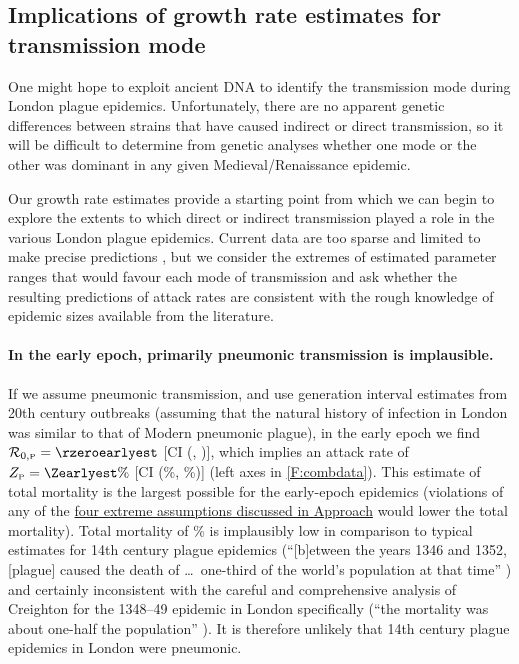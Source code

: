 \hypertarget{implications}{}
\subsection*{Implications of growth rate estimates for transmission mode}
\label{sec:implications}

One might hope to exploit ancient DNA \cite{Bos+11,Wagn+14} to identify the transmission mode during London plague epidemics.  Unfortunately, there are no apparent genetic differences between strains that have caused indirect or direct transmission, so it will be difficult to determine from genetic analyses whether one mode or the other was dominant in any given Medieval/Renaissance epidemic.

Our growth rate estimates provide a starting point from which we can begin to explore the extents to which direct or indirect transmission played a role in the various London plague epidemics.  Current data are too sparse and limited to make precise predictions \cite{Ma+14,Park+18}, but we consider the extremes of estimated parameter ranges that would favour each mode of transmission and ask whether the resulting predictions of attack rates are consistent with the rough knowledge of epidemic sizes available from the literature.

\paragraph{In the early epoch, primarily pneumonic transmission is implausible.}

If we assume pneumonic transmission, and use generation interval estimates from 20th century outbreaks \cite{GaniLeac04} (\ie assuming that the natural history of infection in London was similar to that of Modern pneumonic plague), in the early epoch we find $\rzerop=\rzeroearlyest$ [CI (\rzeroearlylwr, \rzeroearlyupr)], which implies an attack rate of $\Zp=\Zearlyest\%$ [CI (\Zearlylwr\%, \Zearlyupr\%)] (left axes in \cref{F:combdata}).  This estimate of total mortality is the largest possible for the early-epoch epidemics (violations of any of the \hyperlink{4assumptions}{four extreme assumptions discussed in Approach} would lower the total mortality).  Total mortality of \Zearlyest\% is implausibly low in comparison to typical estimates for 14th century plague epidemics (\eg ``[b]etween the years 1346 and 1352, [plague] caused the death of \ldots\ one-third of the world's population at that time'' \cite{Ligo06}) and certainly inconsistent with the careful and comprehensive analysis of Creighton for the 1348--49 epidemic in London specifically (``the mortality was about one-half the population'' \cite[p.\,128]{Crei65}).  It is therefore unlikely that 14th century plague epidemics in London were pneumonic.

